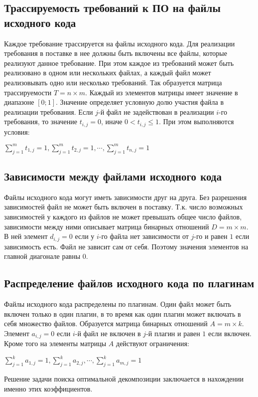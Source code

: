 \subsection*{Трассируемость требований к ПО на файлы исходного кода}
Каждое требование трассируется на файлы исходного кода. Для реализации требования в поставке в нее должны быть включены все файлы, которые реализуют данное требование. При этом каждое из требований может быть реализовано в одном или нескольких файлах, а каждый файл может реализовывать одно или несколько требований. Так образуется матрица трассируемости $T = n \times m$. Каждый из элементов матрицы имеет значение в диапазоне $[0;1]$. Значение определяет условную долю участия файла в реализации требования. Если $j$-й файл не задействован в реализации $i$-го требования, то значение $t_{i, j} = 0$, иначе $0 < t_{i, j} \le 1$. При этом выполняются условия:
\begin{center}
	$
		\displaystyle \sum^{m}_{j = 1}t_{1, j} = 1, 
		\sum^{m}_{j = 1}t_{2, j} = 1, \cdots, \sum^{m}_{j = 1}t_{n, j} = 1
	$
\end{center}

\subsection*{Зависимости между файлами исходного кода}
Файлы исходного кода могут иметь зависимости друг на друга. Без разрешения зависимостей файл не может быть включен в поставку. Т.к. число возможных зависимостей у каждого из файлов не может превышать общее число файлов, зависимости между ними описывает матрица бинарных отношений $D = m \times m$. В ней элемент $d_{i, j} = 0$ если у $i$-го файла нет зависимости от $j$-го и равен $1$ если зависимость есть. Файл не зависит сам от себя. Поэтому значения элементов на главной диагонале равны $0$.

\subsection*{Распределение файлов исходного кода по плагинам}
Файлы исходного кода распределены по плагинам. Один файл может быть включен только в один плагин, в то время как один плагин может включать в себя множество файлов. Образуется матрица бинарных отношений $A = m \times k$. Элемент $a_{i, j} = 0$ если $i$-й файл не включен в $j$-й плагин и равен $1$ если включен. Кроме того на элементы матрицы $A$ действуют ограничения:
\begin{center}
	$
		\displaystyle \sum^{k}_{j = 1}a_{1, j} = 1, \sum^{k}_{j = 1}a_{2, j}, \cdots, \sum^{k}_{j = 1}a_{m, j} = 1
	$
\end{center}
Решение задачи поиска оптимальной декомпозиции заключается в нахождении именно этих коэффициентов.

